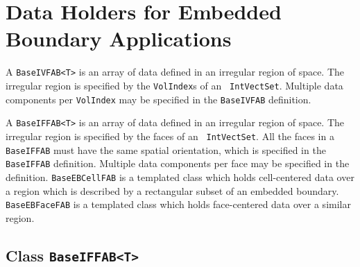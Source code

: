 \section{Data Holders for Embedded Boundary Applications}
\label{sec::ebdata}

A {\tt BaseIVFAB<T>} is an array of data defined in an irregular
region of space.  
The irregular region is specified by the {\tt VolIndex}s of an {\tt
IntVectSet}. 
Multiple data components per {\tt VolIndex} may be specified in the
{\tt BaseIVFAB} definition.

A {\tt BaseIFFAB<T>} is an array of data defined in an irregular
region of space. 
The irregular region is specified by the faces of an {\tt
IntVectSet}. All the faces in a {\tt BaseIFFAB} must 
have the same spatial orientation, which is
specified in the {\tt BaseIFFAB} definition.  Multiple data components per
face may be specified in the definition.
{\tt BaseEBCellFAB} is a templated
class which holds cell-centered 
data over a region which is described by a rectangular 
subset of an embedded boundary.  
{\tt BaseEBFaceFAB}  is a templated
class which holds face-centered data over a similar
region. 


\subsection{Class {\tt BaseIFFAB<T>}}
\label{sec::BaseIFFAB}


